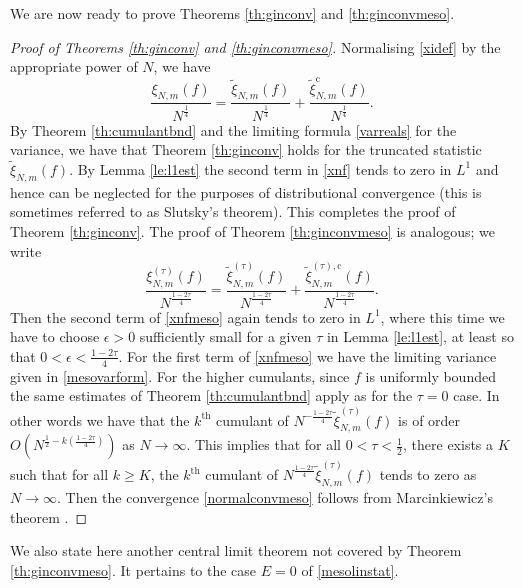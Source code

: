 \documentclass[11pt,reqno]{amsproc}
\numberwithin{equation}{section}
\numberwithin{theorem}{section}
\begin{document}
We are now ready to prove Theorems \ref{th:ginconv} and \ref{th:ginconvmeso}.
\begin{proof}[Proof of Theorems \ref{th:ginconv} and \ref{th:ginconvmeso}]
Normalising \eqref{xidef} by the appropriate power of $N$, we have
\begin{equation}
\frac{\xi_{N,m}(f)}{N^{\frac{1}{4}}} = \frac{\tilde{\xi}_{N,m}(f)}{N^{\frac{1}{4}}} + \frac{\tilde{\xi}^{\mathrm{c}}_{N,m}(f)}{N^{\frac{1}{4}}}. \label{xnf}
\end{equation}
By Theorem \ref{th:cumulantbnd} and the limiting formula \eqref{varreals} for the variance, we have that Theorem \ref{th:ginconv} holds for the truncated statistic $\tilde{\xi}_{N,m}(f)$. By Lemma \ref{le:l1est} the second term in \eqref{xnf} tends to zero in $L^{1}$ and hence can be neglected for the purposes of distributional convergence (this is sometimes referred to as Slutsky's theorem). This completes the proof of Theorem \ref{th:ginconv}. The proof of Theorem \ref{th:ginconvmeso} is analogous; we write
\begin{equation}
\frac{\xi^{(\tau)}_{N,m}(f)}{N^{\frac{1-2\tau}{4}}} = \frac{\tilde{\xi}^{(\tau)}_{N,m}(f)}{N^{\frac{1-2\tau}{4}}} + \frac{\tilde{\xi}^{(\tau),\mathrm{c}}_{N,m}(f)}{N^{\frac{1-2\tau}{4}}}. \label{xnfmeso}
\end{equation}
Then the second term of \eqref{xnfmeso} again tends to zero in $L^{1}$, where this time we have to choose $\epsilon>0$ sufficiently small for a given $\tau$ in Lemma \ref{le:l1est}, at least so that $0 < \epsilon < \frac{1-2\tau}{4}$. For the first term of \eqref{xnfmeso} we have the limiting variance given in \eqref{mesovarform}. For the higher cumulants, since $f$ is uniformly bounded the same estimates of Theorem \ref{th:cumulantbnd} apply as for the $\tau=0$ case. In other words we have that the $k^{\mathrm{th}}$ cumulant of $N^{-\frac{1-2\tau}{4}}\tilde{\xi}^{(\tau)}_{N,m}(f)$ is of order $O\left(N^{\frac{1}{2}-k\left(\frac{1-2\tau}{4}\right)}\right)$ as $N\to \infty$. This implies that for all $0 < \tau < \frac{1}{2}$, there exists a $K$ such that for all $k \geq K$, the $k^{\mathrm{th}}$ cumulant of $N^{\frac{1-2\tau}{4}}\tilde{\xi}^{(\tau)}_{N,m}(f)$ tends to zero as $N \to \infty$. Then the convergence \eqref{normalconvmeso} follows from Marcinkiewicz's theorem \cite{M39}.
\end{proof}
We also state here another central limit theorem not covered by Theorem \ref{th:ginconvmeso}. It pertains to the case $E=0$ of \eqref{mesolinstat}.
\end{document}
